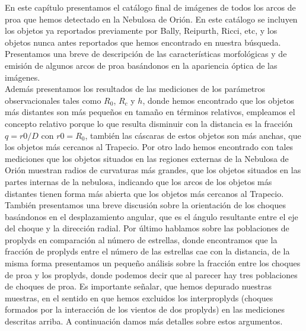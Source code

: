 %



%


\label{chap:results}

En este capítulo presentamos el catálogo final de imágenes  de todos los arcos de proa que hemos detectado en la Nebulosa de Orión. En este catálogo se incluyen los objetos ya reportados previamente por Bally, Reipurth, Ricci, etc, y los objetos nunca antes reportados que hemos encontrado en nuestra búsqueda. Presentamos una breve de descripción de las características morfológicas y de emisión de algunos arcos de proa basándonos en la apariencia óptica de las imágenes.\\

Además presentamos los resultados de las mediciones de los parámetros observacionales tales como \(R_{0}\), \(R_{c}\) y \(h\), donde hemos encontrado que los objetos más distantes son más pequeños en tamaño en términos relativos, empleamos el concepto relativo porque lo que resulta disminuir con la distancia es la  fracción \(q=r0/D\) con \(r0=R_{0}\), también las cáscaras de estos objetos son más anchas, que los objetos más cercanos al Trapecio. Por otro lado hemos encontrado con tales mediciones que los objetos situados en las regiones externas de la Nebulosa de Orión muestran radios de curvaturas más grandes, que los objetos situados en las partes internas de la nebulosa, indicando  que los arcos de los objetos más distantes tienen forma más abierta que los objetos más cercanos al Trapecio. También presentamos una breve discusión sobre la orientación de los choques basándonos en el desplazamiento angular, que es el ángulo resultante entre el eje del choque  y la dirección radial. Por último hablamos sobre las poblaciones de proplyds en comparación al número de estrellas, donde encontramos que la fracción de proplyds entre el número de las estrellas cae con la distancia,  de la misma forma presentamos un pequeño análisis sobre la fracción entre los choques de proa y los proplyds, donde podemos decir que al parecer hay tres poblaciones de choques de proa. Es importante señalar, que hemos depurado nuestras muestras, en el sentido en que hemos excluidos los interproplyds (choques formados por la interacción de los vientos de dos proplyds) en las mediciones descritas arriba. A continuación damos más detalles sobre estos argumentos.    

